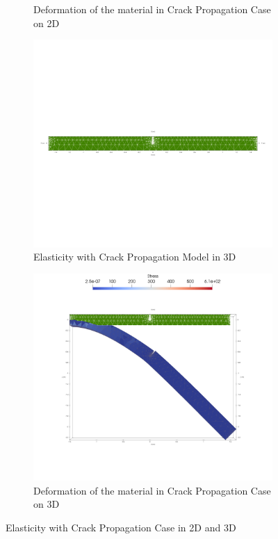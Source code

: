 \documentclass[a4paper,11pt]{article}
\begin{document}
\begin{figure}[h!]
\begin{subfigure}[b]{0.5\linewidth}
		\caption{Deformation of the material in Crack Propagation Case on 2D}
		\label{fig:2dcrackfinal}
	\end{subfigure}
	\quad
	\begin{subfigure}[b]{0.5\linewidth}
		\centering
		\includegraphics[width=\linewidth]{picture/conference/crackmodel3d}
		\caption{Elasticity with Crack Propagation Model in 3D}
		\label{fig:3dcrack}
	\end{subfigure}
	\quad
	\begin{subfigure}[b]{0.5\linewidth}
		\centering
		\includegraphics[width=\linewidth]{picture/conference/cracksol3d}
		\caption{Deformation of the material in Crack Propagation Case on 3D}
		\label{fig:3dcrackfinal}
	\end{subfigure}
	\caption{Elasticity with Crack Propagation Case in 2D and 3D}
	\label{fig:crackmodel}
\end{figure}\\
\end{document}
